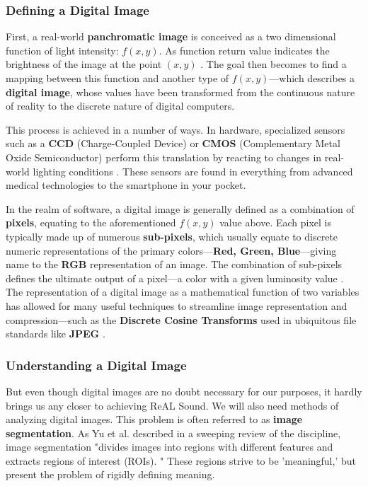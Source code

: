 \documentclass{report}
\newcommand{\rs}{ReAL Sound\xspace}
\newcommand{\tech}[1]{\textbf{#1}}
\begin{document}
\subsubsection{Defining a Digital Image}

First, a real-world \tech{panchromatic image} is conceived as a two dimensional function of light intensity: $f(x,y)$. As function return value indicates the brightness of the image at the point $(x,y)$ \cite{petrou2010image}. The goal then becomes to find a mapping between this function and another type of $f(x,y)$---which describes a \tech{digital image}, whose values have been transformed from the continuous nature of reality to the discrete nature of digital computers.

This process is achieved in a number of ways. In hardware, specialized sensors  such as a \tech{CCD} (Charge-Coupled Device) or \tech{CMOS} (Complementary Metal Oxide Semiconductor) perform this translation by reacting to changes in real-world lighting conditions \cite{bigas2006review}. These sensors are found in everything from advanced medical technologies to the smartphone in your pocket.  

In the realm of software, a digital image is generally defined as a combination of \tech{pixels}, equating to the aforementioned $f(x,y)$ value above. Each pixel is typically made up of numerous \tech{sub-pixels}, which usually equate to discrete numeric representations of the primary colors---\tech{Red, Green, Blue}---giving name to the \tech{RGB} representation of an image. The combination of sub-pixels defines the ultimate output of a pixel---a color with a given luminosity value \cite{subpixel}. The representation of a digital image as a mathematical function of two variables has allowed for many useful techniques to streamline image representation and compression---such as the \tech{Discrete Cosine Transforms} used in ubiquitous file standards like \tech{JPEG} \cite{saha2000image}. 

\subsubsection{Understanding a Digital Image}
But even though digital images are no doubt necessary for our purposes, it hardly brings us any closer to achieving \rs. We will also need methods of analyzing digital images. This problem is often referred to as \tech{image segmentation}. As Yu et al. described in a sweeping review of the discipline, image segmentation "divides images into regions with different features and extracts regions of interest (ROIs). \cite{yu2023techniques}" These regions strive to be 'meaningful,' but present the problem of rigidly defining meaning.
\end{document}
